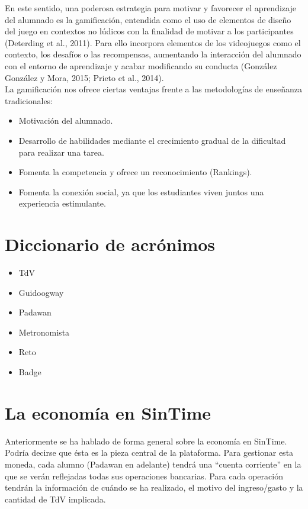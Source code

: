 En este sentido, una poderosa estrategia para motivar y favorecer el aprendizaje del alumnado es la gamificación, entendida como el uso de elementos de diseño del juego en contextos no lúdicos con la finalidad de motivar a los participantes (Deterding et al., 2011). Para ello incorpora elementos de los videojuegos como el contexto, los desafíos o las recompensas, aumentando la interacción del alumnado con el entorno de aprendizaje y acabar modificando su conducta (González González y Mora, 2015; Prieto et al., 2014).\\


La gamificación nos ofrece ciertas ventajas frente a las metodologías de enseñanza tradicionales:\\

\begin{itemize}
\item Motivación del alumnado.
\item Desarrollo de habilidades mediante el crecimiento gradual de la dificultad para realizar una tarea.
\item Fomenta la competencia y ofrece un reconocimiento (Rankings).
\item Fomenta la conexión social, ya que los estudiantes viven juntos una experiencia estimulante.
\end{itemize}

\section{Diccionario de acrónimos}
\begin{itemize}
\item \ac{TdV}
\item \ac{Guidoogway}
\item \ac{Padawan}
\item \ac{Metronomista}
\item \ac{Reto}
\item \ac{Badge}
\end{itemize}

\section{La economía en SinTime}
Anteriormente se ha hablado de forma general sobre la economía en SinTime. Podría decirse que ésta es la pieza central de la plataforma. Para gestionar esta moneda, cada alumno (Padawan en adelante) tendrá una ``cuenta corriente'' en la que se verán reflejadas todas sus operaciones bancarias. Para cada operación tendrán la información de cuándo se ha realizado, el motivo del ingreso/gasto y la cantidad de TdV implicada.\\


